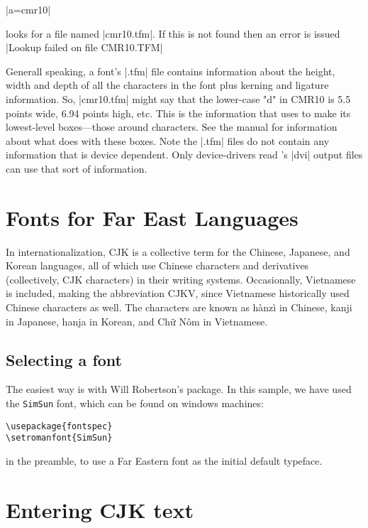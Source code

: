 |\font a=cmr10|

\noindent \tex looks for  a file named |cmr10.tfm|. If this is not found then an error is issued |Lookup failed on file CMR10.TFM|

Generall speaking, a font's |.tfm| file contains information about the height, width and depth of all the characters in the font plus kerning and ligature information. So, |cmr10.tfm| might say that the lower-case "d" in CMR10 is 5.5 points wide, 6.94 points high, etc. This is the information that \tex uses to make its lowest-level boxes---those around characters. See the \tex manual for information about what \tex does with these boxes. Note the |.tfm| files do not contain any information that is device dependent. Only device-drivers read \tex's |dvi| output files can use that sort of information.


\section{Fonts for Far East Languages}

In internationalization, CJK is a collective term for the Chinese, Japanese, and Korean languages, all of which use Chinese characters and derivatives (collectively, CJK characters) in their writing systems. Occasionally, Vietnamese is included, making the abbreviation CJKV, since Vietnamese historically used Chinese characters as well.
The characters are known as hànzì in Chinese, kanji in Japanese, hanja in Korean, and Chữ Nôm in Vietnamese.


\subsection{Selecting a font}

The easiest way is with Will Robertson's  package. In this sample, we have used the \texttt{SimSun} font, which can be found on windows machines:

\begin{verbatim}
\usepackage{fontspec}
\setromanfont{SimSun}
\end{verbatim}
in the preamble, to use a Far Eastern font as the initial default typeface.

\section{Entering CJK text}

